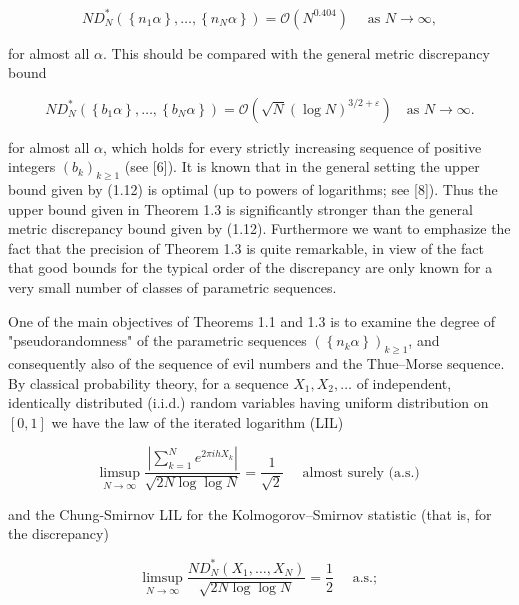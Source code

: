 \documentclass[10pt]{article}
\newcommand{\1}{\mathbf{1}}
\begin{document}
$$
N D_{N}^{*}\left(\left\{n_{1} \alpha\right\}, \ldots,\left\{n_{N} \alpha\right\}\right)=\mathcal{O}\left(N^{0.404}\right) \quad \text { as } N \rightarrow \infty,
$$

for almost all $\alpha$. This should be compared with the general metric discrepancy bound


\begin{equation*}
N D_{N}^{*}\left(\left\{b_{1} \alpha\right\}, \ldots,\left\{b_{N} \alpha\right\}\right)=\mathcal{O}\left(\sqrt{N}(\log N)^{3 / 2+\varepsilon}\right) \quad\text{as }N\rightarrow\infty. \tag{1.12}
\end{equation*}


for almost all $\alpha$, which holds for every strictly increasing sequence of positive integers $\left(b_{k}\right)_{k \geqslant 1}$ (see [6]). It is known that in the general setting the upper bound given by (1.12) is optimal (up to powers of logarithms; see [8]). Thus the upper bound given in Theorem 1.3 is significantly stronger than the general metric discrepancy bound given by (1.12). Furthermore we want to emphasize the fact that the precision of Theorem 1.3 is quite remarkable, in view of the fact that good bounds for the typical order of the discrepancy are only known for a very small number of classes of parametric sequences.

One of the main objectives of Theorems 1.1 and 1.3 is to examine the degree of "pseudorandomness" of the parametric sequences $\left(\left\{n_{k} \alpha\right\}\right)_{k \geqslant 1}$, and consequently also of the sequence of evil numbers and the Thue--Morse sequence. By classical probability theory, for a sequence $X_{1}, X_{2}, \ldots$ of independent, identically distributed (i.i.d.) random variables having uniform distribution on $[0,1]$ we have the law of the iterated logarithm (LIL)


\begin{equation*}
\limsup _{N \rightarrow \infty} \frac{\left|\sum_{k=1}^{N} e^{2 \pi i h X_{k}}\right|}{\sqrt{2 N \log \log N}}=\frac{1}{\sqrt{2}} \quad \text { almost surely (a.s.) } \tag{1.13}
\end{equation*}


and the Chung-Smirnov LIL for the Kolmogorov--Smirnov statistic (that is, for the discrepancy)


\begin{equation*}
\limsup _{N \rightarrow \infty} \frac{N D_{N}^{*}\left(X_{1}, \ldots, X_{N}\right)}{\sqrt{2 N \log \log N}}=\frac{1}{2} \quad \text { a.s.; } \tag{1.14}
\end{equation*}
\end{document}
